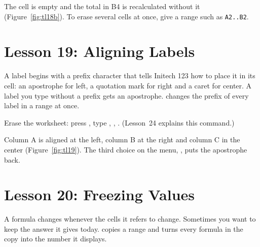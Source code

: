 \begin{Keystrokes}
\end{Keystrokes}
The cell is empty and the total in B4 is recalculated without it
(Figure~\ref{fig:tl18b}).
To erase several cells at once, give a range such as \texttt{A2..B2}.

\section{Lesson 19: Aligning Labels}
A label begins with a prefix character that tells Initech 123 how to place
it in its cell: an apostrophe for left, a quotation mark for right and a
caret for center.  A label you type without a prefix gets an apostrophe.
 changes the prefix of every label in a range at
once.

Erase the worksheet: press , type , ,
.  (Lesson~24 explains this command.)

\begin{Keystrokes}
\end{Keystrokes}
Column A is aligned at the left, column B at the right and column C in the
center (Figure~\ref{fig:tl19}).  The third choice on the menu,
, puts the apostrophe back.

\section{Lesson 20: Freezing Values}
A formula changes whenever the cells it refers to change.  Sometimes you
want to keep the answer it gives today.   copies a
range and turns every formula in the copy into the number it displays.

